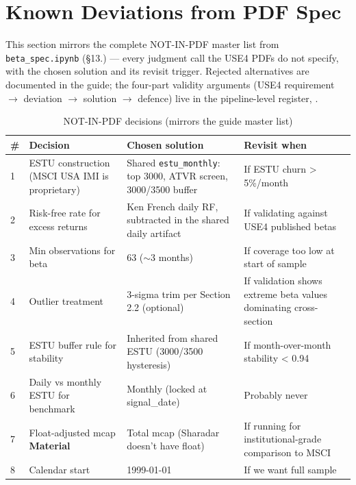\documentclass[11pt,a4paper]{article}
\newcommand{\WARN}[1]{\textcolor{warn}{\textbf{#1}}}
\begin{document}
\section{Known Deviations from PDF Spec}

This section mirrors the complete NOT-IN-PDF master list from
\texttt{beta\_spec.ipynb} (\S13.) --- every judgment call the USE4 PDFs do not
specify, with the chosen solution and its revisit trigger. Rejected alternatives
are documented in the guide; the four-part validity arguments (USE4 requirement
$\to$ deviation $\to$ solution $\to$ defence) live in the pipeline-level
register, .

\begin{longtable}{@{}p{0.5cm}p{3.6cm}p{6.0cm}p{3.8cm}@{}}
\caption{NOT-IN-PDF decisions (mirrors the guide master list)}\\
\toprule
\textbf{\#} & \textbf{Decision} & \textbf{Chosen solution} & \textbf{Revisit when} \\
\midrule
\endhead
1 & ESTU construction (MSCI USA IMI is proprietary) & Shared \texttt{estu\_monthly}: top 3000, ATVR screen, 3000/3500 buffer & If ESTU churn > 5\%/month \\[3pt]
2 & Risk-free rate for excess returns & Ken French daily RF, subtracted in the shared daily artifact & If validating against USE4 published betas \\[3pt]
3 & Min observations for beta & 63 ($\sim$3 months) & If coverage too low at start of sample \\[3pt]
4 & Outlier treatment & 3-sigma trim per Section 2.2 (optional) & If validation shows extreme beta values dominating cross-section \\[3pt]
5 & ESTU buffer rule for stability & Inherited from shared ESTU (3000/3500 hysteresis) & If month-over-month stability < 0.94 \\[3pt]
6 & Daily vs monthly ESTU for benchmark & Monthly (locked at signal\_date) & Probably never \\[3pt]
7 & Float-adjusted mcap \WARN{Material} & Total mcap (Sharadar doesn't have float) & If running for institutional-grade comparison to MSCI \\[3pt]
8 & Calendar start & 1999-01-01 & If we want full sample \\[3pt]
\bottomrule
\end{longtable}

\end{document}
